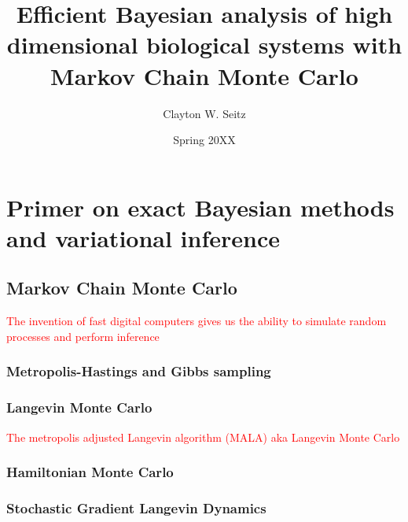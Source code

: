 \documentclass{ucetd}
\title{Efficient Bayesian analysis of high dimensional biological systems with Markov Chain Monte Carlo}
\author{Clayton W. Seitz}
\date{Spring 20XX}
\begin{document}
\maketitle

\makecopyright


\tableofcontents


\abstract



\clearpage

\mainmatter

\chapter{Primer on exact Bayesian methods and variational inference}

\section{Markov Chain Monte Carlo}

\textcolor{red}{The invention of fast digital computers gives us the ability to simulate random processes and perform inference}

\subsection{Metropolis-Hastings and Gibbs sampling}

\subsection{Langevin Monte Carlo} 

\textcolor{red}{The metropolis adjusted Langevin algorithm (MALA) aka Langevin Monte Carlo}

\subsection{Hamiltonian Monte Carlo}

\subsection{Stochastic Gradient Langevin Dynamics}
\end{document}
